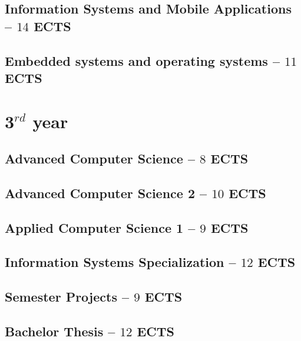 \documentclass[11pt]{article}
\newcommand{\module}[2]{
    \subsection[#1]{#1 \small -- $#2$ ECTS}
}
\begin{document}
\module{Information Systems and Mobile Applications}{14}
\pagebreak

\pagebreak
\module{Embedded systems and operating systems}{11}


%
%
\section{3$^{rd}$ year}
\module{Advanced Computer Science}{8}
\pagebreak
\pagebreak

\module{Advanced Computer Science 2}{10}
\pagebreak

\pagebreak
\module{Applied Computer Science 1}{9}

\module{Information Systems Specialization}{12}

\pagebreak
\module{Semester Projects}{9}

\module{Bachelor Thesis}{12}
\end{document}
